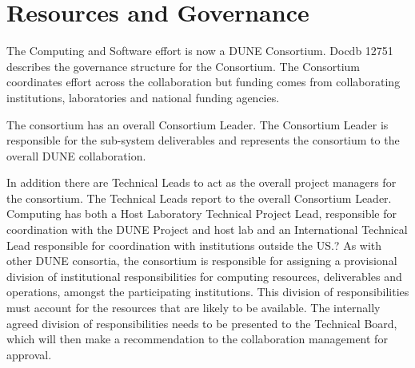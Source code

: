 








\section{Resources and Governance}		
\label{ch:exec-comp-gov}

The Computing and Software effort is now a DUNE Consortium.  Docdb 12751  describes the governance structure for the Consortium.  The Consortium coordinates effort across the collaboration but funding comes from collaborating institutions, laboratories and national funding agencies. 

The consortium has an overall Consortium Leader. The Consortium Leader is responsible for the sub-system deliverables and represents the consortium to the overall DUNE collaboration.

In addition there  are Technical Leads to act as the overall project managers for the consortium. The Technical Leads report to the overall Consortium Leader.
Computing has both a Host Laboratory Technical Project Lead, responsible for coordination with the DUNE Project and host lab and an International Technical Lead responsible for coordination with institutions outside the US.?
As with other DUNE consortia, the consortium is responsible for assigning a provisional division of institutional
responsibilities for computing resources, deliverables and operations, amongst the participating institutions. This division of responsibilities must account for the resources that are likely to be available. The internally agreed division of responsibilities needs to be presented to the Technical Board, which will then make a recommendation to the collaboration management for approval.



